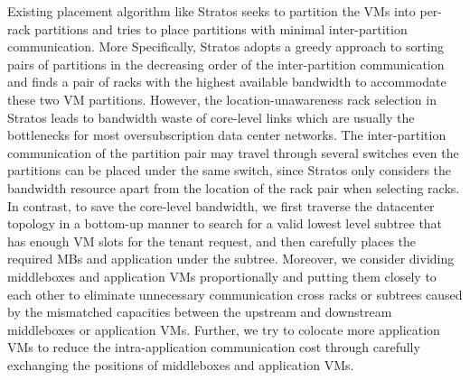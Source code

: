 \documentclass[review]{elsarticle}
\begin{document}
Existing placement algorithm like Stratos \cite{stratos12} seeks to partition the VMs into per-rack partitions and tries to place partitions with minimal inter-partition communication. More Specifically, 
Stratos adopts a greedy approach to sorting pairs of partitions in the decreasing
order of the inter-partition communication and finds a pair of racks with the highest available bandwidth to accommodate
these two VM partitions. However, the location-unawareness rack selection in Stratos leads to bandwidth waste of core-level links which are usually the bottlenecks for most oversubscription data center networks. The inter-partition communication of the partition pair may travel through several switches %
even the partitions can be placed under the same switch, since Stratos only considers the bandwidth resource apart from the location of the rack pair when selecting racks.  %
In contrast, %
to save the core-level bandwidth,
we first traverse the datacenter topology in a bottom-up manner to search for a valid lowest level subtree \cite{B11tpd} that has enough VM slots for the tenant request, and then carefully places the required MBs and application under the subtree. 
Moreover, 
we consider dividing middleboxes and application VMs proportionally and putting them closely to each other 
to eliminate unnecessary communication cross racks or subtrees caused by the mismatched capacities between the upstream and downstream middleboxes or application VMs. 
Further, we try to colocate more application VMs to reduce the intra-application communication cost through carefully exchanging the positions of middleboxes and application VMs.
\end{document}
